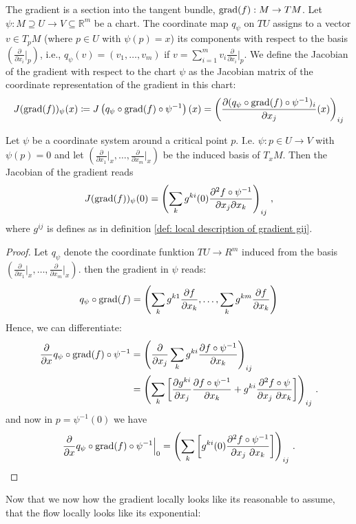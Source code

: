 \begin{definition}
	The gradient is a section into the tangent bundle, $\mathrm{grad}(f):M\to TM$.
	Let $\psi: M\supseteq U\to V \subseteq \mathbb{R}^m$ be a chart. The coordinate map $q_{\psi}$ on $TU$ assigns to a vector $v \in T_pM$ (where $p \in U$ with $\psi(p) = x$) its components with respect to the basis $\left(\frac{\partial}{\partial x_i}\big|_p\right)$, i.e., $q_{\psi}(v) = (v_1, \ldots, v_m)$ if $v = \sum_{i=1}^m v_i \frac{\partial}{\partial x_i}\big|_p$.
	We define the Jacobian of the gradient with respect to the chart $\psi$ as the Jacobian matrix of the coordinate representation of the gradient in this chart:
	\[
	J(\mathrm{grad}(f))_\psi(x) \coloneq J\left(q_{\psi}\circ \mathrm{grad}(f)\circ \psi^{-1}\right)(x) = \left(\frac{\partial (q_{\psi}\circ \mathrm{grad}(f)\circ \psi^{-1})_i}{\partial x_j}(x)\right)_{ij}
	\]
\end{definition}




\begin{lemma}
	Let $\psi$ be a coordinate system around a critical point $p$. I.e. $\psi: p\in U\to V$ with $\psi(p)=0$ and let $\left( \frac{\partial}{\partial x_1}\big|_x,\dots ,\frac{\partial}{\partial x_m}\big|_x\right)$ be the induced basis of $T_xM$. Then the Jacobian of the gradient reads
	\begin{equation}
		J(\mathrm{grad}(f))_\psi(0)= \left(\sum_{k}g^{ki}(0)\frac{\partial ^2 f\circ \psi^{-1} }{\partial x_j \partial x_k} \right)_{ij}\, ,
	\end{equation}where $g^{ij}$ is defines as in definition \ref{def: local description of gradient gij}.
\end{lemma}
\begin{proof}
	Let $q_{\psi}$ denote the coordinate funktion $TU\to R^m$ induced from the basis $\left( \frac{\partial}{\partial x_1}\big|_x,\dots ,\frac{\partial}{\partial x_m}\big|_x\right)$. then the gradient in $\psi$ reads:
	\begin{align*}
		q_{\psi}\circ \mathrm{grad}(f)=\left(\sum_kg^{k1  }\frac{\partial f	}{\partial x_k},\dots, \sum_kg^{k m }\frac{\partial f	}{\partial x_k}\right)
	\end{align*}
	Hence, we can differentiate: 
	\begin{align*}
		\frac{\partial}{\partial x}  q_{\psi}\circ \mathrm{grad}(f)\circ \psi^{-1}
		&= \left(\frac{\partial}{\partial x_j} \sum_k g^{ki}\frac{\partial f \circ \psi^{-1}}{\partial x_k}\right)_{ij} \\
		&= \left(\sum_k \left[ 
		\frac{\partial g^{ki}}{\partial x_j}\frac{\partial f \circ \psi^{-1}}{\partial x_k} +  g^{ki}\frac{\partial^2 f \circ \psi}{\partial x_j ~\partial x_k}
		\right]\right)_{ij} \, .
	\end{align*}
	and now in $p=\psi^{-1}(0)$ we have
	\begin{align*}
		\frac{\partial}{\partial x}  q_{\psi}\circ \mathrm{grad}(f)\circ \psi^{-1} \Big|_{0}=\left(\sum_k \left[ 
		g^{ki}(0)\frac{\partial^2 f \circ \psi^{-1}}{\partial x_j ~\partial x_k}
		\right]\right)_{ij} \, .
	\end{align*}
\end{proof} Now that we now how the gradient locally looks like its reasonable to assume, that the flow locally looks like its exponential:

